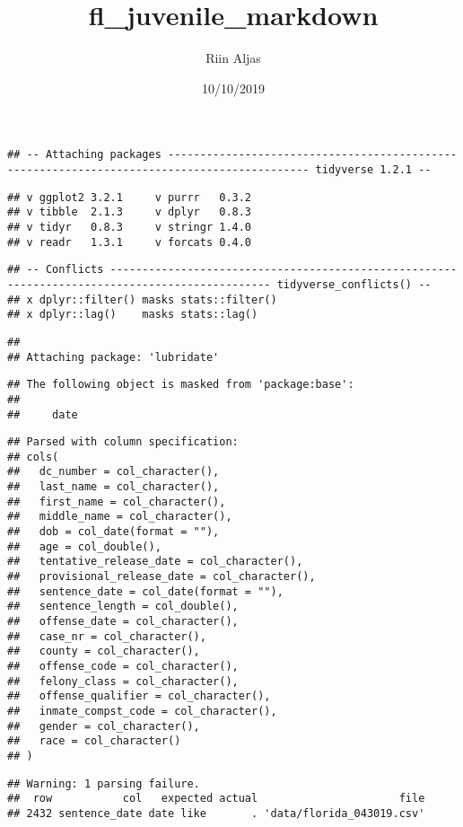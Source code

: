 \documentclass[]{article}
\title{fl\_juvenile\_markdown}
\author{Riin Aljas}
\date{10/10/2019}
\begin{document}
\maketitle

\begin{verbatim}
## -- Attaching packages -------------------------------------------------------------------------------------------- tidyverse 1.2.1 --
\end{verbatim}

\begin{verbatim}
## v ggplot2 3.2.1     v purrr   0.3.2
## v tibble  2.1.3     v dplyr   0.8.3
## v tidyr   0.8.3     v stringr 1.4.0
## v readr   1.3.1     v forcats 0.4.0
\end{verbatim}

\begin{verbatim}
## -- Conflicts ----------------------------------------------------------------------------------------------- tidyverse_conflicts() --
## x dplyr::filter() masks stats::filter()
## x dplyr::lag()    masks stats::lag()
\end{verbatim}

\begin{verbatim}
## 
## Attaching package: 'lubridate'
\end{verbatim}

\begin{verbatim}
## The following object is masked from 'package:base':
## 
##     date
\end{verbatim}

\begin{verbatim}
## Parsed with column specification:
## cols(
##   dc_number = col_character(),
##   last_name = col_character(),
##   first_name = col_character(),
##   middle_name = col_character(),
##   dob = col_date(format = ""),
##   age = col_double(),
##   tentative_release_date = col_character(),
##   provisional_release_date = col_character(),
##   sentence_date = col_date(format = ""),
##   sentence_length = col_double(),
##   offense_date = col_character(),
##   case_nr = col_character(),
##   county = col_character(),
##   offense_code = col_character(),
##   felony_class = col_character(),
##   offense_qualifier = col_character(),
##   inmate_compst_code = col_character(),
##   gender = col_character(),
##   race = col_character()
## )
\end{verbatim}

\begin{verbatim}
## Warning: 1 parsing failure.
##  row           col   expected actual                      file
## 2432 sentence_date date like       . 'data/florida_043019.csv'
\end{verbatim}
\end{document}
